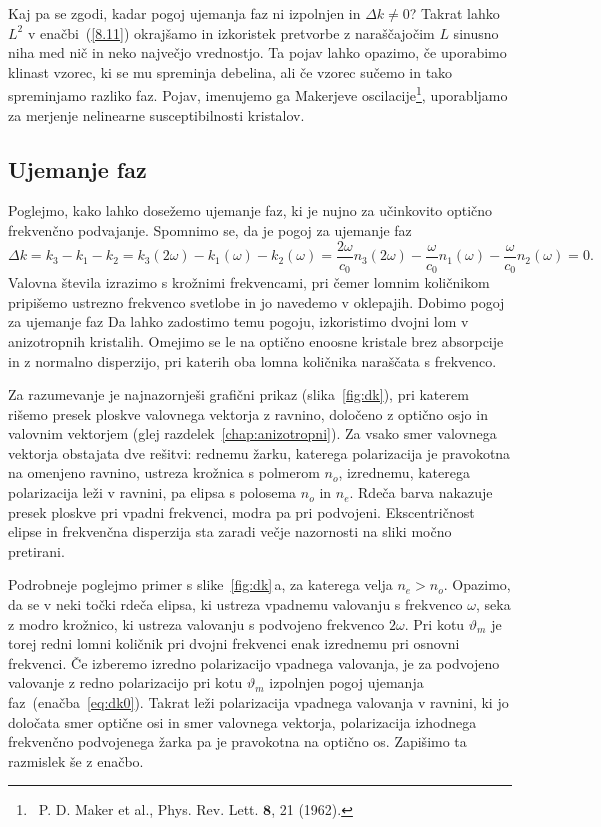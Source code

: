 Kaj pa se zgodi, kadar pogoj ujemanja faz ni izpolnjen in 
 $\Delta k \neq 0$? Takrat lahko  $L^2$ v enačbi~(\ref{8.11})
okrajšamo in izkoristek pretvorbe z naraščajočim
$L$ sinusno niha med nič in neko največjo vrednostjo. Ta pojav lahko opazimo, če
uporabimo klinast vzorec, ki se mu spreminja debelina, ali če vzorec sučemo 
in tako spreminjamo razliko faz. Pojav, imenujemo ga Makerjeve 
oscilacije\footnote{~P. D. Maker et al., Phys. Rev. Lett. $\mathbf{8}$, 21 (1962).}, 
uporabljamo za merjenje nelinearne susceptibilnosti kristalov.

\subsection*{Ujemanje faz}
Poglejmo, kako lahko dosežemo ujemanje faz, ki je nujno za učinkovito optično
frekvenčno podvajanje. Spomnimo se, da je pogoj za ujemanje faz 
\begin{equation}
\Delta k = k_3 - k_1 -k_2 = k_3(2\omega) - k_1(\omega) -k_2(\omega) = 
\frac{2\omega}{c_0} n_3(2\omega) - \frac{\omega}{c_0} n_1(\omega)- \frac{\omega}{c_0} n_2(\omega) =0.
\end{equation}
Valovna števila izrazimo s krožnimi frekvencami, pri čemer 
lomnim količnikom pripišemo ustrezno frekvenco svetlobe in jo navedemo v oklepajih. Dobimo
pogoj za ujemanje faz 
Da lahko zadostimo temu pogoju, izkoristimo dvojni lom v 
anizotropnih kristalih. Omejimo se le na optično 
enoosne kristale brez absorpcije in z 
normalno disperzijo, pri katerih oba lomna količnika naraščata s frekvenco.  

Za razumevanje je najnazornješi grafični prikaz (slika~\ref{fig:dk}), pri katerem
rišemo presek ploskve valovnega vektorja z ravnino, določeno z optično osjo in valovnim
vektorjem (glej razdelek~\ref{chap:anizotropni}). 
Za vsako smer valovnega vektorja obstajata dve rešitvi:
rednemu žarku, katerega polarizacija je pravokotna na omenjeno ravnino,
ustreza krožnica s polmerom $n_o$, izrednemu, katerega polarizacija leži v ravnini, 
pa elipsa s polosema $n_o$ in $n_e$. 
Rdeča barva nakazuje presek ploskve pri vpadni frekvenci, modra pa pri podvojeni. 
Ekscentričnost elipse in frekvenčna disperzija sta zaradi večje nazornosti na sliki 
močno pretirani. 

Podrobneje poglejmo primer s slike~\ref{fig:dk}\,a, za katerega velja $n_e>n_o$. 
Opazimo, da se v neki točki rdeča elipsa, ki ustreza vpadnemu valovanju s frekvenco $\omega$, 
seka z modro krožnico, ki ustreza valovanju s podvojeno frekvenco $2\omega$. Pri kotu 
$\vartheta_m$ je torej redni lomni 
količnik pri dvojni frekvenci enak izrednemu pri osnovni
frekvenci. Če izberemo izredno polarizacijo vpadnega valovanja, je za podvojeno 
valovanje z redno polarizacijo pri kotu $\vartheta_m$ izpolnjen pogoj ujemanja 
faz~(enačba~\ref{eq:dk0}). Takrat leži polarizacija vpadnega valovanja v ravnini,
ki jo določata smer optične osi in smer valovnega vektorja, polarizacija 
izhodnega frekvenčno podvojenega žarka pa 
je pravokotna na optično os. Zapišimo ta razmislek še z enačbo.

